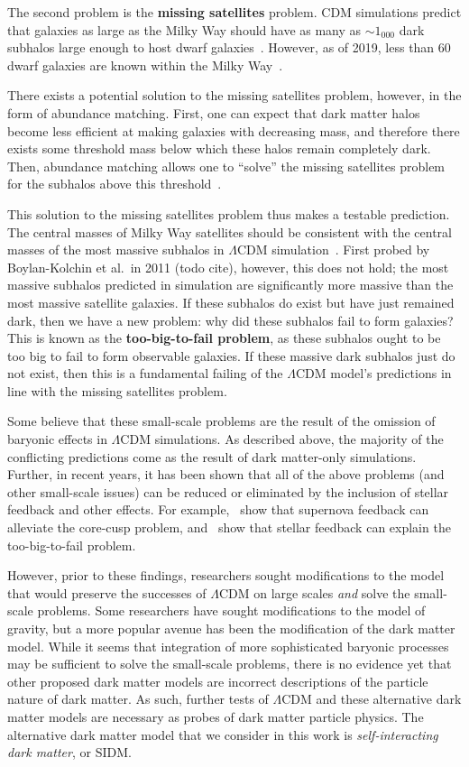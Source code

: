 The second problem is the \textbf{missing satellites} problem. CDM simulations
predict that galaxies as large as the Milky Way should have as many as \(\sim
1_000\) dark subhalos large enough to host dwarf
galaxies~\cite{bullock_small-scale_2017}. However, as of 2019, less than 60
dwarf galaxies are known within the Milky Way~\cite{simon_faintest_2019}.

There exists a potential solution to the missing satellites problem,
however, in the form of abundance matching. First, one can expect that
dark matter halos become less efficient at making galaxies with
decreasing mass, and therefore there exists some threshold mass below
which these halos remain completely dark. Then, abundance matching
allows one to ``solve'' the missing satellites problem for the subhalos
above this threshold~\cite{bullock_small-scale_2017}.

This solution to the missing satellites problem thus makes a testable
prediction. The central masses of Milky Way satellites should be
consistent with the central masses of the most massive subhalos in
\(\Lambda\)CDM simulation~\cite{bullock_small-scale_2017}. First
probed by Boylan-Kolchin et al.~in 2011 (todo cite), however, this does not
hold; the most massive subhalos predicted in simulation are significantly more
massive than the most massive satellite galaxies. If these subhalos do exist
but have just remained dark, then we have a new problem: why did these
subhalos fail to form galaxies? This is known as the \textbf{too-big-to-fail
problem}, as these subhalos ought to be too big to fail to form observable
galaxies. If these massive dark subhalos just do not exist, then this is a
fundamental failing of the \(\Lambda\)CDM model's predictions in line with the
missing satellites problem.

Some believe that these small-scale problems are the result of the omission of
baryonic effects in \(\Lambda\)CDM simulations. As described above, the
majority of the conflicting predictions come as the result of dark matter-only
simulations. Further, in recent years, it has been shown that all of the above
problems (and other small-scale issues) can be reduced or eliminated by the
inclusion of stellar feedback and other effects. For example,~\cite{pontzen_how_2012} show that supernova feedback can alleviate the core-cusp
problem, and~\cite{chan_impact_2015} show that stellar feedback can explain
the too-big-to-fail problem.

However, prior to these findings, researchers sought modifications to the
model that would preserve the successes of \(\Lambda\)CDM on large scales
\emph{and} solve the small-scale problems. Some researchers have sought
modifications to the model of gravity, but a more popular avenue has been the
modification of the dark matter model. While it seems that integration of more
sophisticated baryonic processes may be sufficient to solve the small-scale
problems, there is no evidence yet that other proposed dark matter models are
incorrect descriptions of the particle nature of dark matter. As such, further
tests of \(\Lambda\)CDM and these alternative dark matter models are necessary
as probes of dark matter particle physics. The alternative dark matter model
that we consider in this work is \emph{self-interacting dark matter}, or SIDM.
